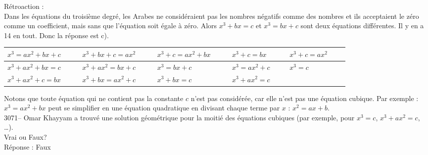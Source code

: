 \documentclass[letterpaper, 12pt]{article}
\begin{document}
R\'etroaction :\\
Dans les \'equations du troisi\`eme degr\'e, les Arabes ne consid\'eraient pas les nombres n\'egatifs comme des nombres et ils acceptaient le z\'ero comme un coefficient, mais sans que l'\'equation soit \'egale \`a z\'ero. Alors $x^{3} + bx = c$ et $x^{3} = bx + c$ sont deux \'equations diff\'erentes. Il y en a 14 en tout. Donc la r\'eponse est c).
\begin{center}
\begin{tabular}{|l|l|l|l|l|}\hline
$x^{3} = ax^{2} + bx + c$ \ \ \ & $x^{3} + bx + c = ax^{2}$ \ \ \ & $x^{3} + c = ax^{2} + bx$ \ \ \ & $x^{3} + c = bx$ \ \ \ & $x^{3} + c = ax^{2}$ \ \ \ \\ \hline
$x^{3} + ax^{2} + bx = c$ \ \ \ & $x^{3} + ax^{2} = bx + c$ \ \ \ & $x^{3} = bx + c$ \ \ \ & $x^{3} = ax^{2} + c$ \ \ \ & $x^{3} = c$\ \ \ \\ \hline
$x^{3} + ax^{2} + c = bx$ \ \ \ & $x^{3} + bx = ax^{2} + c$ \ \ \ & $x^{3} + bx = c$ \ \ \ & $x^{3} + ax^{2} = c$ \ \ \ & \multicolumn{1}{l}{} \ \ \ \\ \cline{1-4}
\end{tabular}
\end{center}
Notons que toute \'equation qui ne contient pas la constante $c$ n'est pas consid\'er\'ee, car elle n'est pas une \'equation cubique. Par exemple : $x^{3} = ax^{2} + bx$ peut se simplifier en une \'equation quadratique en divisant chaque terme par $x$ : $x^{2} = ax + b$.\\



3071-- Omar Khayyam a trouv\'e une solution g\'eom\'etrique pour la moiti\'e des \'equations cubiques (par exemple, pour $x^{3} = c$, $x^{3} + ax^{2} = c$, \dots).\\
Vrai ou Faux?\\

R\'eponse : Faux\\
\end{document}
